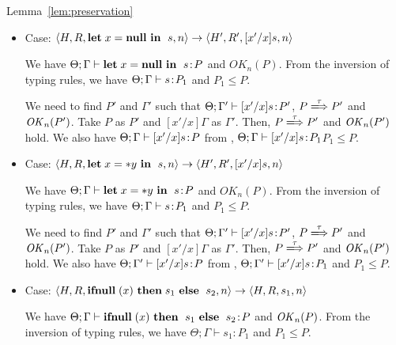 \begin{pfof}{Lemma~\ref{lem:preservation}}
\begin{itemize}
  We need to find $P'$ and \(\Gamma'\) such that \(\Theta; \Gamma'
  \vdash [x'/x]s : P'\) , \(P \xLongrightarrow{\tau} P'\) and
  \(\OK_n(P'\)). Take \(P\) as \(P'\) and \([x'/x]\Gamma\) as
  \(\Gamma'\). Then \( P \xLongrightarrow{\tau} P'\) and \(\OK_n(P')\)
  hold.  We also have \(\Theta; \Gamma \vdash [x'/x]s\COL P\) from
  , \(\Theta; \Gamma \vdash [x'/x]s\COL P_{1}\) and \( P_{1}
  \le P\).

\item Case: $\langle H, R, \LET x = \NULL \ \IN \ s, n \rangle
  \rightarrow \langle H', R', [x'/x]s, n \rangle $

  We have \(\Theta; \Gamma \vdash \mathbf{let}\; x = \mathbf{null} \ \mathbf{in}\; \ s\!:\! P\)
  and \(OK_{n}(P)\). From the inversion of typing rules, we have
  \(\Theta; \Gamma \vdash s\!:\! P_{1}\) and \( P_{1} \le P\).

  We need to find $P'$ and \(\Gamma'\) such that \(\Theta; \Gamma'
  \vdash [x'/x]s\!:\! P'\), \(P \xLongrightarrow{\tau} P'\) and
  \(\OK_n(P')\).  Take \(P\) as \(P'\) and \([x'/x]\Gamma\) as
  \(\Gamma'\).  Then, \(P \xLongrightarrow{\tau} P'\) and
  \(\OK_n(P')\) hold.  We also have \(\Theta; \Gamma \vdash
       [x'/x]s\COL P\) from , \(\Theta; \Gamma \vdash
       [x'/x]s\COL P_{1}\)\( P_{1} \le P\).

\item Case: $\langle H, R, \mathbf{let}\; x = *y \ \mathbf{in}\; \ s, n \rangle
  \rightarrow \langle H', R', [x'/x]s, n \rangle $

  We have \(\Theta; \Gamma \vdash \mathbf{let}\; x = *y \ \mathbf{in}\; \ s\!:\!  P\) and
  \(OK_{n}(P)\). From the inversion of typing rules, we have \(\Theta;
  \Gamma \vdash s\!:\! P_{1}\) and \(P_{1} \le P\).

  We need to find \(P'\) and \(\Gamma'\) such that \(\Theta; \Gamma'
  \vdash [x'/x]s\!:\! P'\), \(P \xLongrightarrow{\tau} P'\) and
  \(\OK_n(P')\). Take \(P\) as \(P'\) and \([x'/x]\Gamma\) as
  \(\Gamma'\). Then, \(P \xLongrightarrow{\tau} P'\) and \(\OK_n(P')\)
  hold.  We also have \(\Theta; \Gamma' \vdash [x'/x]s\!:\! P\) from
  , \(\Theta; \Gamma' \vdash [x'/x]s\!:\! P_{1}\) and \(P_{1}
  \le P\).
        
\item Case: \(\langle H, R, \IFNULL \Cirx \ \THEN s_{1} \ \ELSE
  \ s_{2}, n \rangle \rightarrow \langle H, R, s_{1}, n \rangle\)

  We have \(\Theta; \Gamma \vdash \mathbf{ifnull}\; (x) \ \mathbf{then}\; \ s_{1}
  \ \mathbf{else}\; \ s_{2}\!:\! P\) and \(\mathit{OK}_{n}(P)\). From the inversion of
  typing rules, we have \(\Theta; \Gamma \vdash s_{1} : P_{1}\) and \(P_{1}
  \le P\).


\end{itemize}
\end{pfof}
